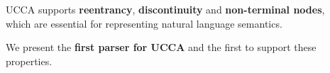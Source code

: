 \documentclass[a0,portrait]{a0poster}
\begin{document}
\vspace{1cm} %
\titlespacing*{\section}{0pt}{8mm}{5mm}


\begin{adjustbox}{margin=3mm,frame,minipage=.6\linewidth,center}
\Large\color{Navy}
  UCCA supports \textbf{reentrancy}, \textbf{discontinuity} and \textbf{non-terminal nodes},\\
  which are essential for representing natural language semantics.
  
  We present the \textbf{first parser for UCCA} and the first to support these properties.
\end{adjustbox}
\end{document}

